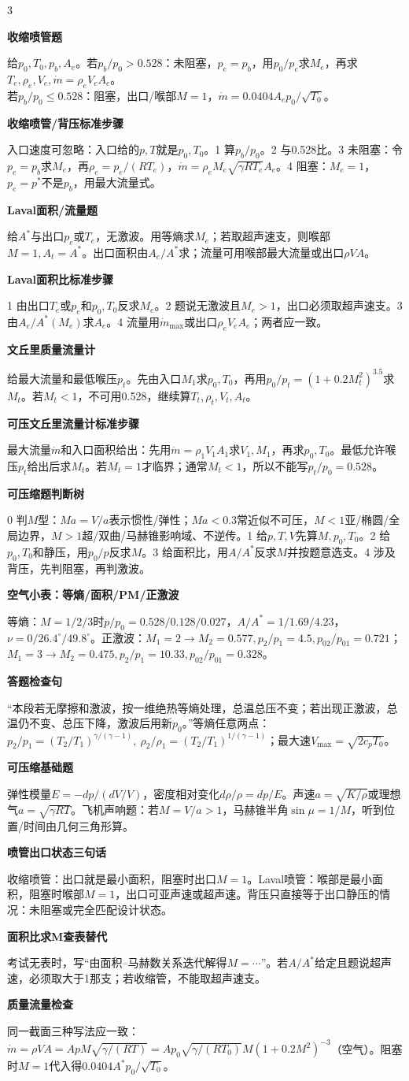 \documentclass[a4paper]{article}
\newcommand{\qt}[1]{\vspace{0.25pt}\colorbox{Q}{\parbox{\dimexpr\linewidth-2\fboxsep}{\color{white}\bfseries #1}}\par}
\newcommand{\sect}[1]{\qt{#1}}
\begin{document}
\begin{multicols}{3}
{\sect{收缩喷管题}
给$p_0,T_0,p_b,A_e$。若$p_b/p_0>0.528$：未阻塞，$p_e=p_b$，用$p_0/p_e$求$M_e$，再求$T_e,\rho_e,V_e,\dot m=\rho_eV_eA_e$。\\
若$p_b/p_0\le0.528$：阻塞，出口/喉部$M=1$，$\dot m=0.0404A_ep_0/\sqrt{T_0}$。
\sect{收缩喷管/背压标准步骤}
入口速度可忽略：入口给的$p,T$就是$p_0,T_0$。1 算$p_b/p_0$。2 与0.528比。3 未阻塞：令$p_e=p_b$求$M_e$，再$\rho_e=p_e/(RT_e)$，$\dot m=\rho_eM_e\sqrt{\gamma RT_e}A_e$。4 阻塞：$M_e=1$，$p_e=p^*$不是$p_b$，用最大流量式。

\sect{Laval面积/流量题}
给$A^*$与出口$p_e$或$T_e$，无激波。用等熵求$M_e$；若取超声速支，则喉部$M=1,A_t=A^*$。出口面积由$A_e/A^*$求；流量可用喉部最大流量或出口$\rho VA$。
\sect{Laval面积比标准步骤}
1 由出口$T_e$或$p_e$和$p_0,T_0$反求$M_e$。2 题说无激波且$M_e>1$，出口必须取超声速支。3 由$A_e/A^*(M_e)$求$A_e$。4 流量用$\dot m_{\max}$或出口$\rho_eV_eA_e$；两者应一致。

\sect{文丘里质量流量计}
给最大流量和最低喉压$p_t$。先由入口$M_1$求$p_0,T_0$，再用$p_0/p_t=(1+0.2M_t^2)^{3.5}$求$M_t$。若$M_t<1$，不可用0.528，继续算$T_t,\rho_t,V_t,A_t$。
\sect{可压文丘里流量计标准步骤}
最大流量$\dot m$和入口面积给出：先用$\dot m=\rho_1V_1A_1$求$V_1,M_1$，再求$p_0,T_0$。最低允许喉压$p_t$给出后求$M_t$。若$M_t=1$才临界；通常$M_t<1$，所以不能写$p_t/p_0=0.528$。
\sect{可压缩题判断树}
0 判$M$型：$Ma=V/a$表示惯性/弹性；$Ma<0.3$常近似不可压，$M<1$亚/椭圆/全局边界，$M>1$超/双曲/马赫锥影响域、不逆传。1 给$p,T,V$先算$M,p_0,T_0$。2 给$p_0,T_0$和静压，用$p_0/p$反求$M$。3 给面积比，用$A/A^*$反求$M$并按题意选支。4 涉及背压，先判阻塞，再判激波。
\sect{空气小表：等熵/面积/PM/正激波}
等熵：$M=1/2/3$时$p/p_0=0.528/0.128/0.027$，$A/A^*=1/1.69/4.23$，$\nu=0/26.4^\circ/49.8^\circ$。正激波：$M_1=2\to M_2=0.577,p_2/p_1=4.5,p_{02}/p_{01}=0.721$；$M_1=3\to M_2=0.475,p_2/p_1=10.33,p_{02}/p_{01}=0.328$。
\sect{答题检查句}
“本段若无摩擦和激波，按一维绝热等熵处理，总温总压不变；若出现正激波，总温仍不变、总压下降，激波后用新$p_0$。”等熵任意两点：$p_2/p_1=(T_2/T_1)^{\gamma/(\gamma-1)},\ \rho_2/\rho_1=(T_2/T_1)^{1/(\gamma-1)}$；最大速$V_{\max}=\sqrt{2c_pT_0}$。
\sect{可压缩基础题}
弹性模量$E=-dp/(dV/V)$，密度相对变化$d\rho/\rho=dp/E$。声速$a=\sqrt{K/\rho}$或理想气$a=\sqrt{\gamma RT}$。飞机声响题：若$M=V/a>1$，马赫锥半角$\sin\mu=1/M$，听到位置/时间由几何三角形算。
\sect{喷管出口状态三句话}
收缩喷管：出口就是最小面积，阻塞时出口$M=1$。Laval喷管：喉部是最小面积，阻塞时喉部$M=1$，出口可亚声速或超声速。背压只直接等于出口静压的情况：未阻塞或完全匹配设计状态。
\sect{面积比求M查表替代}
考试无表时，写“由面积--马赫数关系迭代解得$M=\cdots$”。若$A/A^*$给定且题说超声速，必须取大于1那支；若收缩管，不能取超声速支。
\sect{质量流量检查}
同一截面三种写法应一致：$\dot m=\rho VA=ApM\sqrt{\gamma/(RT)}=A p_0\sqrt{\gamma/(RT_0)}M(1+0.2M^2)^{-3}$（空气）。阻塞时$M=1$代入得$0.0404A^*p_0/\sqrt{T_0}$。
}


\end{multicols}
\end{document}
